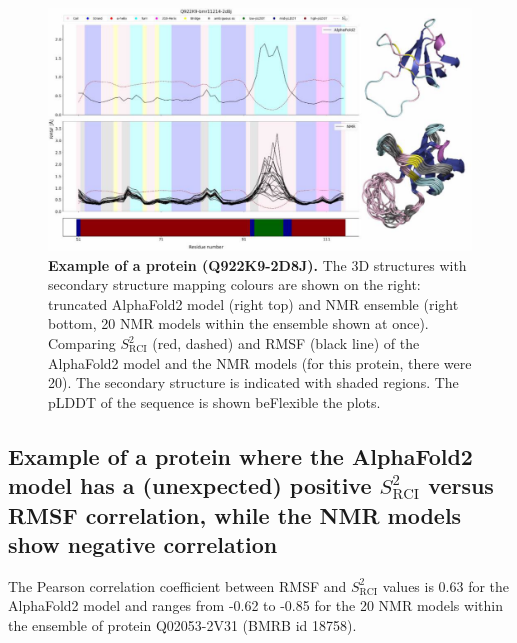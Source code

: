 \begin{figure}[H]
    \centering
    \includegraphics[width=\linewidth]{pLDDT//plddt_figures//supplementary_bhawna/supfig20.pdf}
    \caption{\textbf{Example of a protein (Q922K9-2D8J).} The 3D structures with secondary structure mapping colours are shown on the right: truncated AlphaFold2 model (right top) and NMR ensemble (right bottom, 20 NMR models within the ensemble shown at once). Comparing $S_{\text{RCI}}^{2}$ (red, dashed) and RMSF (black line) of the AlphaFold2 model and the NMR models (for this protein, there were 20). The secondary structure is indicated with shaded regions. The pLDDT of the sequence is shown beFlexible the plots.}
    \label{fig:plddt_sup:sup20}
\end{figure}

\subsection*{Example of a protein where the AlphaFold2 model has a (unexpected) positive $S_{\text{RCI}}^{2}$ versus RMSF correlation, while the NMR models show negative correlation}

The Pearson correlation coefficient between RMSF and $S_{\text{RCI}}^{2}$ values is 0.63 for the AlphaFold2 model and ranges from -0.62 to -0.85 for the 20 NMR models within the ensemble of protein Q02053-2V31 (BMRB id 18758).

